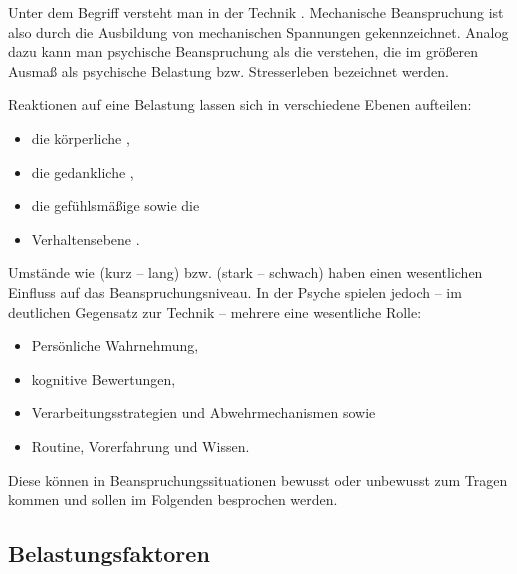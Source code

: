 Unter dem Begriff  versteht man in der
Technik 
\cite{wiki:beanspruchung20110814}. Mechanische Beanspruchung
ist also durch die Ausbildung von mechanischen Spannungen
gekennzeichnet. Analog dazu kann man psychische
Beanspruchung als die  verstehen, die im größeren Ausmaß als
psychische Belastung bzw.
Stresserleben bezeichnet werden. 


Reaktionen auf eine
Belastung lassen sich in verschiedene
Ebenen aufteilen: 
\begin{itemize}
  \item die körperliche ,
  \item die gedankliche ,
  \item die gefühlsmäßige  sowie die
  \item Verhaltensebene . 
\end{itemize}



Umstände wie
 (kurz -- lang) bzw. 
 (stark -- schwach) haben einen wesentlichen
Einfluss auf das Beanspruchungsniveau. In der Psyche
spielen jedoch -- im deutlichen Gegensatz zur Technik --
mehrere  eine wesentliche Rolle: 

\begin{itemize}
  \item Persönliche Wahrnehmung,  
  \item kognitive Bewertungen, 
  \item Verarbeitungsstrategien und Abwehrmechanismen sowie
  \item Routine, Vorerfahrung und Wissen. 
\end{itemize}



Diese können in
Beanspruchungssituationen bewusst oder unbewusst zum Tragen
kommen und sollen im Folgenden besprochen werden.

\subsection{Belastungsfaktoren}

